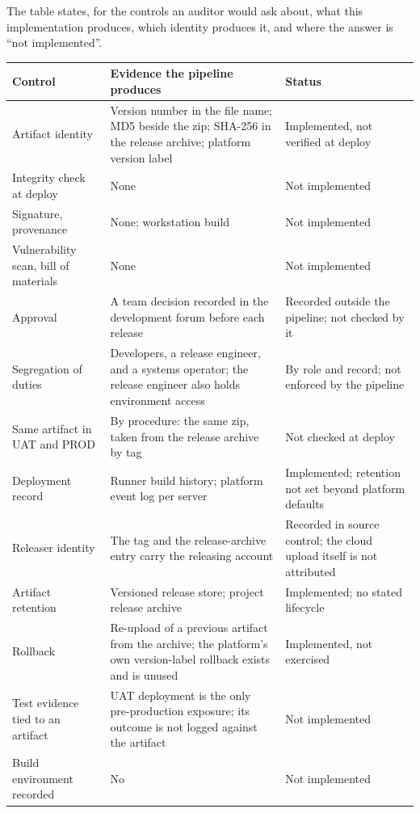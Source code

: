 \documentclass[11pt]{article}
\begin{document}
The table states, for the controls an auditor would ask about, what this implementation produces, which identity produces it, and where the answer is ``not implemented''.

\begin{center}
\begin{tabularx}{\textwidth}{@{}lYY@{}}
\toprule
Control & Evidence the pipeline produces & Status \\
\midrule
Artifact identity & Version number in the file name; MD5 beside the zip; SHA-256 in the release archive; platform version label & Implemented, not verified at deploy \\
Integrity check at deploy & None & Not implemented \\
Signature, provenance & None; workstation build & Not implemented \\
Vulnerability scan, bill of materials & None & Not implemented \\
Approval & A team decision recorded in the development forum before each release & Recorded outside the pipeline; not checked by it \\
Segregation of duties & Developers, a release engineer, and a systems operator; the release engineer also holds environment access & By role and record; not enforced by the pipeline \\
Same artifact in UAT and PROD & By procedure: the same zip, taken from the release archive by tag & Not checked at deploy \\
Deployment record & Runner build history; platform event log per server & Implemented; retention not set beyond platform defaults \\
Releaser identity & The tag and the release-archive entry carry the releasing account & Recorded in source control; the cloud upload itself is not attributed \\
Artifact retention & Versioned release store; project release archive & Implemented; no stated lifecycle \\
Rollback & Re-upload of a previous artifact from the archive; the platform's own version-label rollback exists and is unused & Implemented, not exercised \\
Test evidence tied to an artifact & UAT deployment is the only pre-production exposure; its outcome is not logged against the artifact & Not implemented \\
Build environment recorded & No & Not implemented \\
\bottomrule
\end{tabularx}
\end{center}
\end{document}
